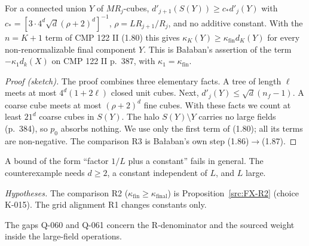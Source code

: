 \begin{proposition}\label{src:FX-O1}
For a connected union $Y$ of $MR_j$-cubes, $d'_{j+1}(S(Y))\ge c_*d'_j(Y)$ with $c_*=[3\cdot4^d\sqrt d(\rho+2)^d]^{-1}$, $\rho=LR_{j+1}/R_j$, and no additive constant. With the $n=K+1$ term of CMP 122 II (1.80) this gives $\kappa_K(Y)\ge\kappa_{\mathrm{fin}}d_K(Y)$ for every non-renormalizable final component $Y$. This is Ba{\l}aban's assertion of the term $-\kappa_1d_k(X)$ on CMP 122 II p.~387, with $\kappa_1=\kappa_{\mathrm{fin}}$.
\end{proposition}
\begin{proof}[Proof (sketch)]
The proof combines three elementary facts. A tree of length $\ell$ meets at most $4^d(1+2\ell)$ closed unit cubes. Next, $d'_j(Y)\le\sqrt d(n_f-1)$. A coarse cube meets at most $(\rho+2)^d$ fine cubes. With these facts we count at least $21^d$ coarse cubes in $S(Y)$. The halo $S(Y)\setminus Y$ carries no large fields (p.~384), so $p_0$ absorbs nothing. We use only the first term of (1.80); all its terms are non-negative. The comparison R3 is Ba{\l}aban's own step (1.86)$\to$(1.87).
\end{proof}
\begin{remark}
A bound of the form ``factor $1/L$ plus a constant'' fails in general. The counterexample needs $d\ge2$, a constant independent of $L$, and $L$ large.
\end{remark}
\emph{Hypotheses.} The comparison R2 ($\kappa_{\mathrm{fin}}\ge\kappa_{\mathrm{final}}$) is Proposition~\ref{src:FX-R2} (choice K-015). The grid alignment R1 changes constants only.

The gaps Q-060 and Q-061 concern the R-denominator and the sourced weight inside the large-field operations.

